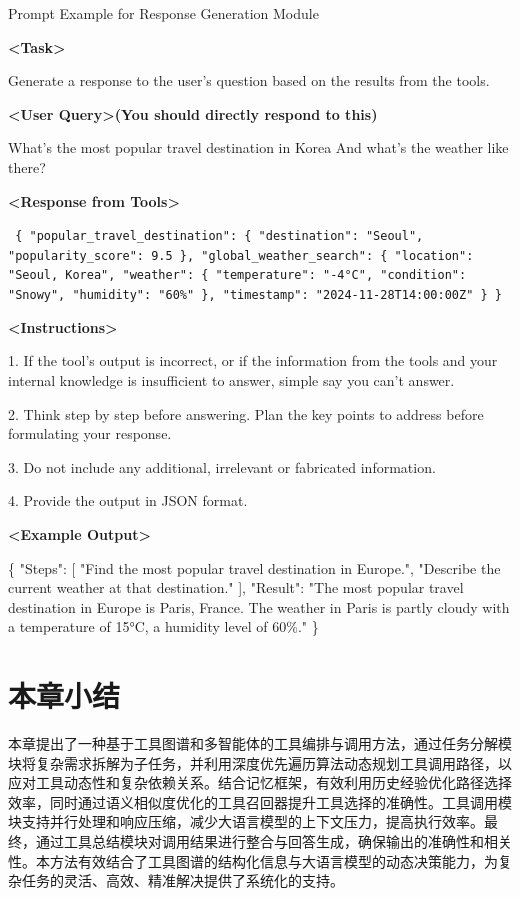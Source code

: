 \begin{table}[htbp]
  \centering
  \caption{工具响应总结模块prompt构建示例}{Prompt Example for Response Generation Module} %
  \label{tab:tool-summary} %
\begin{tcolorbox}[colback=bgcolor, colframe=black, width=0.95\textwidth, boxrule=0.5mm, 
coltitle=white, colbacktitle=titlecolor, title=An Example for Response Generation with GPT-4]


\textbf{<Task>} 

Generate a response to the user's question based on the results from the tools.

\textbf{<User Query>(You should directly respond to this)}

What's the most popular travel destination in Korea And what's the weather like there?

\textbf{<Response from Tools>} 

\texttt{%
\{ "popular\_travel\_destination": \{ "destination": "Seoul", "popularity\_score": 9.5 \}, 
  "global\_weather\_search": \{ "location": "Seoul, Korea", 
    "weather": \{ "temperature": "-4°C", "condition": "Snowy", "humidity": "60\%" \}, 
    "timestamp": "2024-11-28T14:00:00Z" \} 
\}%
}

\textbf{<Instructions>}

1. If the tool's output is incorrect, or if the information from the tools and your internal knowledge is insufficient to answer, simple say you can't answer.

2. Think step by step before answering. Plan the key points to address before formulating your response.

3. Do not include any additional, irrelevant or fabricated information.

4. Provide the output in JSON format.

\textbf{<Example Output>}  

\{%
    "Steps": [%
        "Find the most popular travel destination in Europe.",%
        "Describe the current weather at that destination."%
    ],%
    "Result": "The most popular travel destination in Europe is Paris, France. The weather in Paris is partly cloudy with a temperature of 15°C, a humidity level of 60\%."%
\}

\end{tcolorbox}
\end{table}

\section{本章小结}
\label{sec:summary_chap4}

本章提出了一种基于工具图谱和多智能体的工具编排与调用方法，通过任务分解模块将复杂需求拆解为子任务，并利用深度优先遍历算法动态规划工具调用路径，以应对工具动态性和复杂依赖关系。结合记忆框架，有效利用历史经验优化路径选择效率，同时通过语义相似度优化的工具召回器提升工具选择的准确性。工具调用模块支持并行处理和响应压缩，减少大语言模型的上下文压力，提高执行效率。最终，通过工具总结模块对调用结果进行整合与回答生成，确保输出的准确性和相关性。本方法有效结合了工具图谱的结构化信息与大语言模型的动态决策能力，为复杂任务的灵活、高效、精准解决提供了系统化的支持。